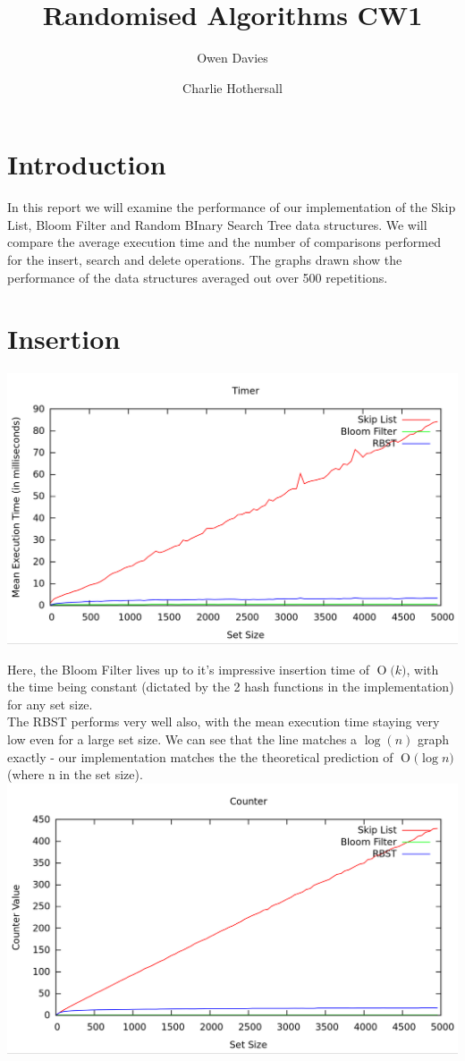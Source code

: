 \documentclass[11pt, notitlepage]{report}
\title{Randomised Algorithms CW1}
\date{}
\author{Owen Davies \and Charlie Hothersall}
\newcommand{\BigO}[1]{\ensuremath{\operatorname{O}\bigl(#1\bigr)}}
\begin{document}
\maketitle

\section*{Introduction}

In this report we will examine the performance of our implementation of the Skip List, Bloom Filter and Random BInary Search Tree data structures. We will compare the average execution time and the number of comparisons performed for the insert, search and delete operations. The graphs drawn show the performance of the data structures averaged out over 500 repetitions.

\section*{Insertion}

\includegraphics[width=\linewidth]{img/Timer-Add}

Here, the Bloom Filter lives up to it's impressive insertion time of \BigO{k}, with the time being constant (dictated by the 2 hash functions in the implementation) for any set size.\\

The RBST performs very well also, with the mean execution time staying very low even for a large set size. We can see that the line matches a $\log(n)$ graph exactly - our implementation matches the the theoretical prediction of \BigO{\log n} (where n in the set size).\\


\includegraphics[width=\linewidth]{img/Counter-Add}
\end{document}
